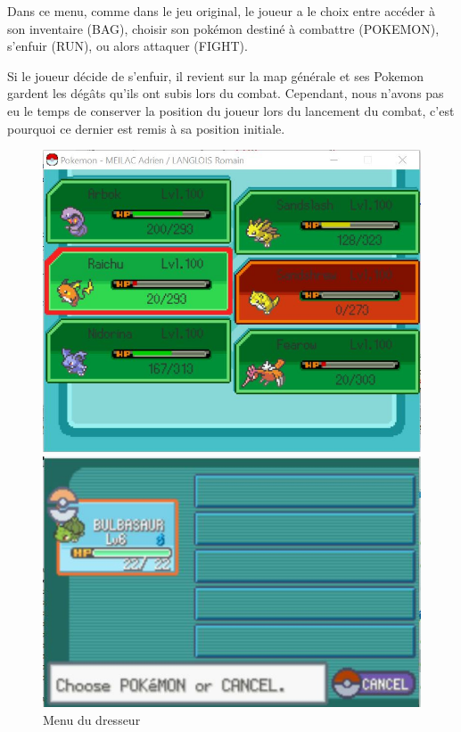 Dans ce menu, comme dans le jeu original, le joueur a le choix entre accéder à son inventaire (BAG), choisir son pokémon destiné à combattre (POKEMON), s'enfuir (RUN), ou alors attaquer (FIGHT).

Si le joueur décide de s'enfuir, il revient sur la map générale et ses Pokemon gardent les dégâts qu'ils ont subis lors du combat. Cependant, nous n'avons pas eu le temps de conserver la position du joueur lors du lancement du combat, c'est pourquoi ce dernier est remis à sa position initiale. 

\begin{figure}[!h]
\begin{minipage}{0.49\textwidth}
\includegraphics[scale = 0.6]{../Images/swapMenu.jpg}
\end{minipage}
\begin{minipage}{0.49\textwidth}
\includegraphics[scale = 0.84]{../Images/vrai_jeu_swapMenu.jpg}
\end{minipage}
\caption{Menu du dresseur}
\end{figure}


